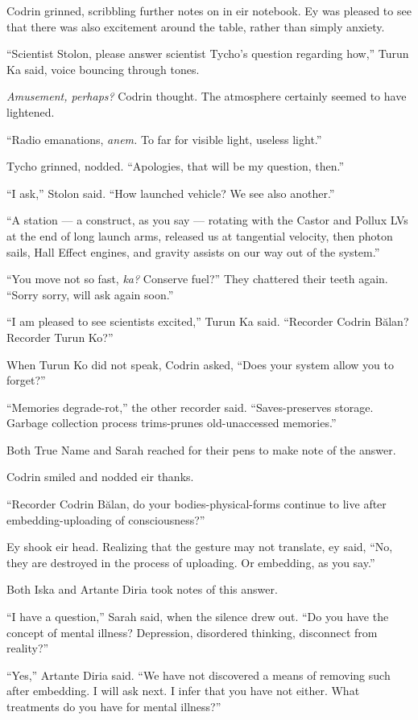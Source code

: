 Codrin grinned, scribbling further notes on in eir notebook. Ey was pleased to see that there was also excitement around the table, rather than simply anxiety.

``Scientist Stolon, please answer scientist Tycho's question regarding how,'' Turun Ka said, voice bouncing through tones.

\emph{Amusement, perhaps?} Codrin thought. The atmosphere certainly seemed to have lightened.

``Radio emanations, \emph{anem.} To far for visible light, useless light.''

Tycho grinned, nodded. ``Apologies, that will be my question, then.''

``I ask,'' Stolon said. ``How launched vehicle? We see also another.''

``A station — a construct, as you say — rotating with the Castor and Pollux LVs at the end of long launch arms, released us at tangential velocity, then photon sails, Hall Effect engines, and gravity assists on our way out of the system.''

``You move not so fast, \emph{ka?} Conserve fuel?'' They chattered their teeth again. ``Sorry sorry, will ask again soon.''

``I am pleased to see scientists excited,'' Turun Ka said. ``Recorder Codrin Bălan? Recorder Turun Ko?''

When Turun Ko did not speak, Codrin asked, ``Does your system allow you to forget?''

``Memories degrade-rot,'' the other recorder said. ``Saves-preserves storage. Garbage collection process trims-prunes old-unaccessed memories.''

Both True Name and Sarah reached for their pens to make note of the answer.

Codrin smiled and nodded eir thanks.

``Recorder Codrin Bălan, do your bodies-physical-forms continue to live after embedding-uploading of consciousness?''

Ey shook eir head. Realizing that the gesture may not translate, ey said, ``No, they are destroyed in the process of uploading. Or embedding, as you say.''

Both Iska and Artante Diria took notes of this answer.

``I have a question,'' Sarah said, when the silence drew out. ``Do you have the concept of mental illness? Depression, disordered thinking, disconnect from reality?''

``Yes,'' Artante Diria said. ``We have not discovered a means of removing such after embedding. I will ask next. I infer that you have not either. What treatments do you have for mental illness?''

